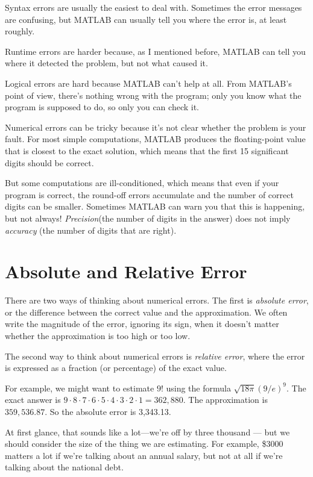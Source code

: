 Syntax errors are usually the easiest to deal with.  Sometimes the error messages
are confusing, but MATLAB can usually tell you where the error is, at
least roughly.

Runtime errors are harder because, as I mentioned before, MATLAB
can tell you where it detected the problem, but not what caused it.

Logical errors are hard because MATLAB can't help at all.  
From MATLAB's point of view, there's nothing wrong with the program; only you
know what the program is supposed to do, so only you can check it.


Numerical errors can be tricky because it's not clear whether the
problem is your fault.  For most simple computations, MATLAB produces
the floating-point value that is closest to the exact solution, which
means that the first 15 significant digits should be correct.  

But some computations are ill-conditioned, which means that even if your program is correct, the round-off errors accumulate and the number of correct digits can be smaller.  Sometimes MATLAB can warn you that
this is happening, but not always!  \emph{Precision}(the number of digits
in the answer) does not imply \emph{accuracy} (the number of digits that
are right).


\section{Absolute and Relative Error}

There are two ways of thinking about numerical errors. 
The first is \emph{absolute error}, or the difference between the correct value and the approximation.  We often write the magnitude of the error,
ignoring its sign, when it doesn't matter whether the approximation
is too high or too low.
 

The second way to think about numerical errors is \emph{relative error}, where the error is expressed as a fraction (or percentage) of the exact value.

For example, we might want to estimate $9!$ using the formula $\sqrt
{18 \pi} ( 9 / e)^9$.  The exact answer is $9 \cdot 8 \cdot 7 \cdot 6
\cdot 5 \cdot 4 \cdot 3 \cdot 2 \cdot 1 = 362,880$.  The approximation
is $359,536.87$.  So the absolute error is 3,343.13.

At first glance, that sounds like a lot---we're off by three
thousand --- but we should consider the size of the
thing we are estimating.  For example, \$3000 matters a lot
if we're talking about an annual salary, but not at all if we're talking about the national debt.


